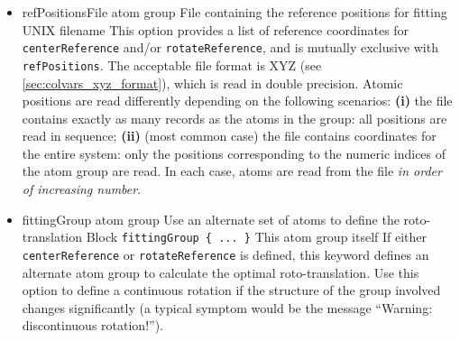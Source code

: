 \begin{itemize}
\item %
  \key
    {refPositionsFile}{%
    atom group}{%
    File containing the reference positions for fitting}{%
    UNIX filename}{%
    \label{key:colvars:atom_group:refPositionsFile}
    This option provides a list of reference coordinates for \texttt{centerReference} and/or \texttt{rotateReference}, and is mutually exclusive with \texttt{refPositions}.
    The acceptable file format is XYZ (see \ref{sec:colvars_xyz_format}), which is read in double precision.
    Atomic positions are read differently depending on the following scenarios:
    \textbf{(i)} the file contains exactly as many records as the atoms in the group: all positions are read in sequence;
    \textbf{(ii)} (most common case) the file contains coordinates for the entire system: only the positions corresponding to the numeric indices of the atom group are read.
    In each case, atoms are read from the file \emph{in order of increasing number}.
}



\item %
  \keydef
    {fittingGroup}{%
    atom group}{%
    Use an alternate set of atoms to define the roto-translation}{%
    Block \texttt{fittingGroup \{ ... \}}}{%
    This atom group itself}{%
    If either \texttt{centerReference} or \texttt{rotateReference} is defined, this keyword defines an alternate atom group to calculate the optimal roto-translation.
    Use this option to define a continuous rotation if the structure of the group involved changes significantly (a typical symptom would be the message ``Warning: discontinuous rotation!'').}

\end{itemize}

